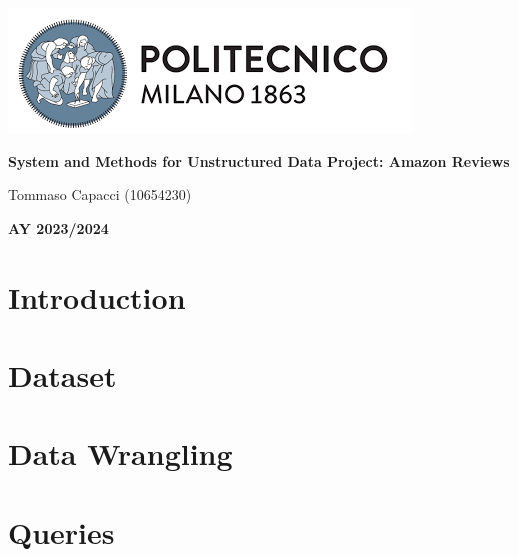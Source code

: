 \documentclass[table, 12pt]{article}
\begin{document}
\begin{titlepage}
    \centering
    \vfill
    \includegraphics[scale=0.9]{Images/PolimiLogo.png}\par\vspace{1cm}
    \vspace{1cm}
    {\huge\bfseries System and Methods for Unstructured Data Project: Amazon Reviews \par}
    \vspace{3cm}
    {\Large {Tommaso Capacci (10654230)}\par}
    \vfill
    {\large \textbf{AY 2023/2024}\par}
    \vfill
\end{titlepage}
\thispagestyle{plain}
\mbox{}
\newpage
{}
\tableofcontents
\newpage
{}

\clearpage
{{\section{Introduction}}}
\label{sect:introduction}

\clearpage
{{\section{Dataset}}}
\label{sect:dataset}

\clearpage
{{\section{Data Wrangling}}}
\label{sect:wrangling}

\clearpage
{{\section{Queries}}}
\label{sect:queries}

\end{document}

